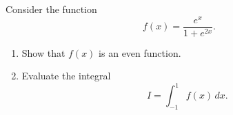 Consider the function
\[
f(x) = \frac{e^x}{1 + e^{2x}}.
\]
\begin{enumerate}
    \item Show that \( f(x) \) is an even function.
    \item Evaluate the integral
    \[
    I = \int_{-1}^{1} f(x) \, dx.
    \]
\end{enumerate}